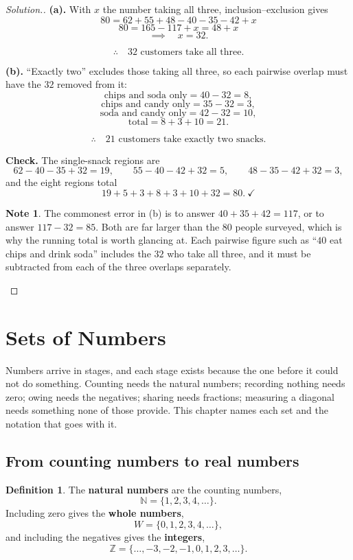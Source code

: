 \documentclass[11pt,a4paper]{article}
\theoremstyle{definition}
\newtheorem{definition}[thm]{Definition}
\newtheorem{note}[thm]{Note}
\newenvironment{solution}
  {\renewcommand{\qedsymbol}{}\begin{proof}[\textit{Solution}.]}
  {\end{proof}}
\let\amscheckmark\checkmark
\renewcommand{\checkmark}{\ensuremath{\amscheckmark}}
\begin{document}
\begin{solution}
\textbf{(a).} With $x$ the number taking all three, inclusion--exclusion gives
$$80=62+55+48-40-35-42+x$$
$$80=165-117+x=48+x$$
$$\implies\quad x=32.$$

$$\therefore\quad 32 \text{ customers take all three}.$$

\textbf{(b).} ``Exactly two'' excludes those taking all three, so each pairwise overlap
must have the $32$ removed from it:
$$\text{chips and soda only}=40-32=8,$$
$$\text{chips and candy only}=35-32=3,$$
$$\text{soda and candy only}=42-32=10,$$
$$\text{total}=8+3+10=21.$$

$$\therefore\quad 21 \text{ customers take exactly two snacks}.$$

\textbf{Check.} The single-snack regions are
$$62-40-35+32=19,\qquad 55-40-42+32=5,\qquad 48-35-42+32=3,$$
and the eight regions total
$$19+5+3+8+3+10+32=80.\ \checkmark$$

\begin{note}
The commonest error in (b) is to answer $40+35+42=117$, or to answer
$117-32=85$. Both are far larger than the $80$ people surveyed, which is why the
running total is worth glancing at. Each pairwise figure such as ``$40$ eat chips and
drink soda'' includes the $32$ who take all three, and it must be subtracted from each of
the three overlaps separately.
\end{note}
\end{solution}

\section{Sets of Numbers}

Numbers arrive in stages, and each stage exists because the one before it could not
do something. Counting needs the natural numbers; recording nothing needs zero;
owing needs the negatives; sharing needs fractions; measuring a diagonal needs
something none of those provide. This chapter names each set and the notation that
goes with it.

\subsection{From counting numbers to real numbers}

\begin{definition}
The \textbf{natural numbers} are the counting numbers,
$$\mathbb{N}=\{1,2,3,4,\ldots\}.$$
Including zero gives the \textbf{whole numbers},
$$W=\{0,1,2,3,4,\ldots\},$$
and including the negatives gives the \textbf{integers},
$$\mathbb{Z}=\{\ldots,-3,-2,-1,0,1,2,3,\ldots\}.$$
\end{definition}
\end{document}

